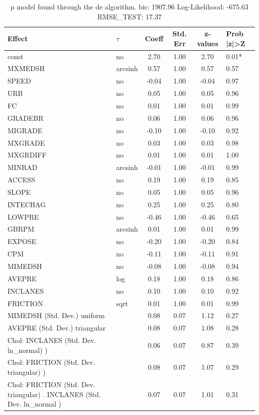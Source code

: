 \begin{table}
	\caption{p model found through the de algorithm. bic: 1907.96 Log-Likelihood: -675.63 RMSE_TEST: 17.37}
	\begin{center}
		\begin{tabular}{|l|l|c|c|c|l|}
			\hline
			Effect & $\tau$ & Coeff & Std. Err & z-values & Prob |z|>Z \\
			\hline
			const & no & 2.70 & 1.00 & 2.70 & 0.01* \\
			\hline
			MXMEDSH & arcsinh & 0.57 & 1.00 & 0.57 & 0.57 \\
			\hline
			SPEED & no & -0.04 & 1.00 & -0.04 & 0.97 \\
			\hline
			URB & no & 0.05 & 1.00 & 0.05 & 0.96 \\
			\hline
			FC & no & 0.01 & 1.00 & 0.01 & 0.99 \\
			\hline
			GRADEBR & no & 0.06 & 1.00 & 0.06 & 0.96 \\
			\hline
			MIGRADE & no & -0.10 & 1.00 & -0.10 & 0.92 \\
			\hline
			MXGRADE & no & 0.03 & 1.00 & 0.03 & 0.98 \\
			\hline
			MXGRDIFF & no & 0.01 & 1.00 & 0.01 & 1.00 \\
			\hline
			MINRAD & arcsinh & -0.01 & 1.00 & -0.01 & 0.99 \\
			\hline
			ACCESS & no & 0.19 & 1.00 & 0.19 & 0.85 \\
			\hline
			SLOPE & no & 0.05 & 1.00 & 0.05 & 0.96 \\
			\hline
			INTECHAG & no & 0.25 & 1.00 & 0.25 & 0.80 \\
			\hline
			LOWPRE & no & -0.46 & 1.00 & -0.46 & 0.65 \\
			\hline
			GBRPM & arcsinh & 0.01 & 1.00 & 0.01 & 0.99 \\
			\hline
			EXPOSE & no & -0.20 & 1.00 & -0.20 & 0.84 \\
			\hline
			CPM & no & -0.11 & 1.00 & -0.11 & 0.91 \\
			\hline
			MIMEDSH & no & -0.08 & 1.00 & -0.08 & 0.94 \\
			\hline
			AVEPRE & log & 0.18 & 1.00 & 0.18 & 0.86 \\
			\hline
			INCLANES & no & 0.10 & 1.00 & 0.10 & 0.92 \\
			\hline
			FRICTION & sqrt & 0.01 & 1.00 & 0.01 & 0.99 \\
			\hline
			MIMEDSH (Std. Dev.) uniform &  & 0.08 & 0.07 & 1.12 & 0.27 \\
			\hline
			AVEPRE (Std. Dev.) triangular &  & 0.08 & 0.07 & 1.08 & 0.28 \\
			\hline
			 Chol: INCLANES (Std. Dev. ln_normal) ) &  & 0.06 & 0.07 & 0.87 & 0.39 \\
			\hline
			 Chol: FRICTION (Std. Dev. triangular) ) &  & 0.08 & 0.07 & 1.07 & 0.29 \\
			\hline
			 Chol: FRICTION (Std. Dev. triangular) . INCLANES (Std. Dev.   ln_normal ) &  & 0.07 & 0.07 & 1.01 & 0.31 \\
			\hline
		\end{tabular}
	\end{center}
\end{table}